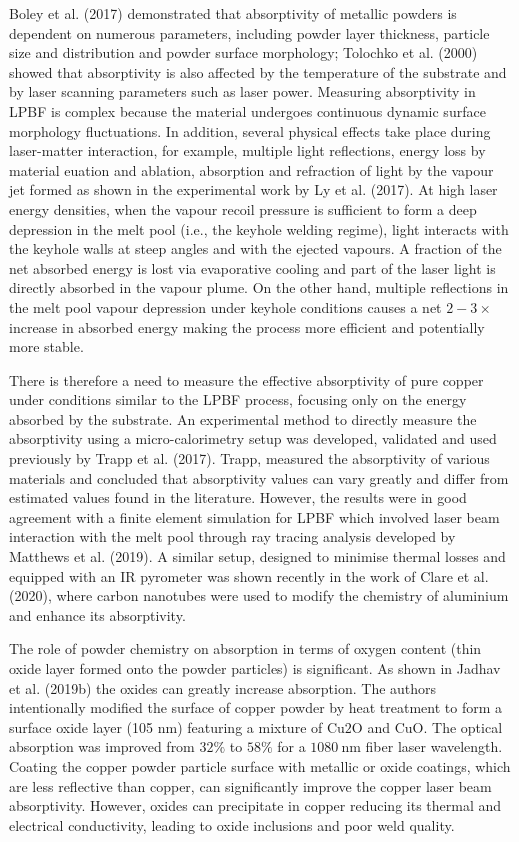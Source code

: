 \documentclass[10pt]{article}
\begin{document}
Boley et al. (2017) demonstrated that absorptivity of metallic powders is dependent on numerous parameters, including powder layer thickness, particle size and distribution and powder surface morphology; Tolochko et al. (2000) showed that absorptivity is also affected by the temperature of the substrate and by laser scanning parameters such as laser power. Measuring absorptivity in LPBF is complex because the material undergoes continuous dynamic surface morphology fluctuations. In addition, several physical effects take place during laser-matter interaction, for example, multiple light reflections, energy loss by material euation and ablation, absorption and refraction of light by the vapour jet formed as shown in the experimental work by Ly et al. (2017). At high laser energy densities, when the vapour recoil pressure is sufficient to form a deep depression in the melt pool (i.e., the keyhole welding regime), light interacts with the keyhole walls at steep angles and with the ejected vapours. A fraction of the net absorbed energy is lost via evaporative cooling and part of the laser light is directly absorbed in the vapour plume. On the other hand, multiple reflections in the melt pool vapour depression under keyhole conditions causes a net $2-3 \times$ increase in absorbed energy making the process more efficient and potentially more stable.

There is therefore a need to measure the effective absorptivity of pure copper under conditions similar to the LPBF process, focusing only on the energy absorbed by the substrate. An experimental method to directly measure the absorptivity using a micro-calorimetry setup was developed, validated and used previously by Trapp et al. (2017). Trapp, measured the absorptivity of various materials and concluded that absorptivity values can vary greatly and differ from estimated values found in the literature. However, the results were in good agreement with a finite element simulation for LPBF which involved laser beam interaction with the melt pool through ray tracing analysis developed by Matthews et al. (2019). A similar setup, designed to minimise thermal losses and equipped with an IR pyrometer was shown recently in the work of Clare et al. (2020), where carbon nanotubes were used to modify the chemistry of aluminium and enhance its absorptivity.

The role of powder chemistry on absorption in terms of oxygen content (thin oxide layer formed onto the powder particles) is significant. As shown in Jadhav et al. (2019b) the oxides can greatly increase absorption. The authors intentionally modified the surface of copper powder by heat treatment to form a surface oxide layer (105 nm) featuring a mixture of $\mathrm{Cu} 2 \mathrm{O}$ and $\mathrm{CuO}$. The optical absorption was improved from $32 \%$ to $58 \%$ for a $1080 \mathrm{~nm}$ fiber laser wavelength. Coating the copper powder particle surface with metallic or oxide coatings, which are less reflective than copper, can significantly improve the copper laser beam absorptivity. However, oxides can precipitate in copper reducing its thermal and electrical conductivity, leading to oxide inclusions and poor weld quality.
\end{document}
